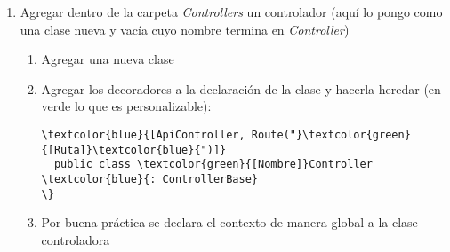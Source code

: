\documentclass[11pt]{article} %
\begin{document}
\begin{enumerate}
\begin{enumerate}
\begin{Verbatim}[commandchars=\\\{\}]
    public DbSet<\textcolor{green}{[ClaseModelo]}> \textcolor{green}{[Modelo]}Items \{ get; set; \}
  \}
\}
\end{Verbatim}
\item Registrar el contexto de datos modificando \emph{Startup.cs} agregando el código en azul
\begin{Verbatim}[commandchars=\\\{\}]
public void ConfigureServices(IServiceCollection services) \{
  \textcolor{blue}{services.AddDbContext<[Nombre]Context>(opt =>}
  \textcolor{blue}{opt.UseInMemoryDatabase("TodoList"));}
  services.AddControllers();
\}
\end{Verbatim}
\end{enumerate}
\item Agregar dentro de la carpeta \emph{Controllers} un controlador (aquí lo pongo como una clase nueva y vacía cuyo nombre termina en \emph{Controller})
\begin{enumerate}
\item Agregar una nueva clase
\item Agregar los decoradores a la declaración de la clase y hacerla heredar (en verde lo que es personalizable):
\begin{Verbatim}[commandchars=\\\{\}]
  \textcolor{blue}{[ApiController, Route("}\textcolor{green}{[Ruta]}\textcolor{blue}{")]}
  public class \textcolor{green}{[Nombre]}Controller \textcolor{blue}{: ControllerBase}
\}
\end{Verbatim}
\item Por buena práctica se declara el contexto de manera global a la clase controladora
\end{enumerate}
\end{enumerate}
\end{document}
